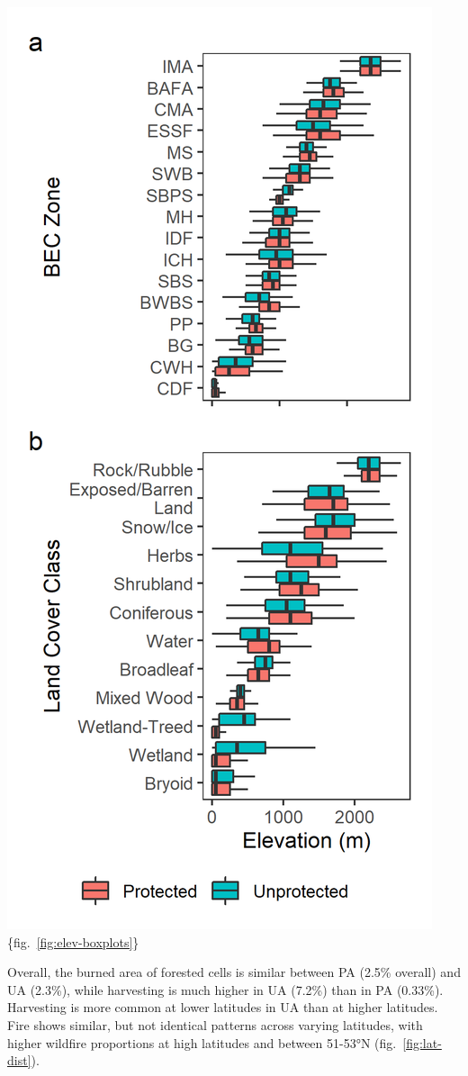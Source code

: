 \documentclass[11pt]{article}
\makeatletter
\def\maxwidth{\ifdim\Gin@nat@width>\linewidth\linewidth
\else\Gin@nat@width\fi}
\let\Oldincludegraphics\includegraphics
\renewcommand{\includegraphics}[1]{\Oldincludegraphics[width=\maxwidth]{#1}}
\makeatother
\begin{document}
\includegraphics{figures/elev_boxplots.png}\{fig.~\ref{fig:elev-boxplots}\}

Overall, the burned area of forested cells is similar between PA (2.5\%
overall) and UA (2.3\%), while harvesting is much higher in UA (7.2\%)
than in PA (0.33\%). Harvesting is more common at lower latitudes in UA
than at higher latitudes. Fire shows similar, but not identical patterns
across varying latitudes, with higher wildfire proportions at high
latitudes and between 51-53°N (fig.~\ref{fig:lat-dist}).
\end{document}
